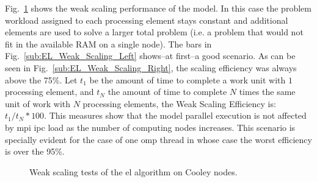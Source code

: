 \documentclass[10pt,journal,compsoc]{IEEEtran}
\begin{document}
Fig.~\ref{fig:EL_Weak_Scaling} shows the weak scaling performance of the model. In this case the problem workload assigned to each processing element stays constant and additional elements are used to solve a larger total problem (i.e. a problem that would not fit in the available RAM on a single node). The bars in Fig.~\ref{sub:EL_Weak_Scaling_Left} shows--at first--a good scenario. As can be seen in Fig.~\ref{sub:EL_Weak_Scaling_Right}, the scaling efficiency was always above the 75\%. Let $t_1$ be the amount of time to complete a work unit with $1$ processing element, and $t_N$ the amount of time to complete $N$ times the same unit of work with $N$ processing elements, the Weak Scaling Efficiency is: $t_1 / t_N * 100$. This measures show that the model parallel execution is not affected by \gls{mpi} \gls{ipc} load as the number of computing nodes increases. This scenario is specially evident for the case of one \gls{omp} thread in whose case the worst efficiency is over the 95\%.

\begin{figure}[tb] 
    \centering
    \hfill

	\caption{Weak scaling tests of the \gls{el} algorithm on Cooley nodes.}
  \label{fig:EL_Weak_Scaling} 
\end{figure}
\end{document}
